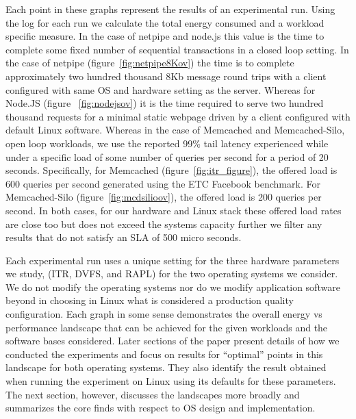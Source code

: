 Each point in these graphs represent the results of an experimental run.  Using
the log for each run we calculate the total energy consumed and a workload
specific measure.  In the case of netpipe and node.js this value is the time to
complete some fixed number of sequential transactions in a closed loop setting.
In the case of netpipe (figure~\ref{fig:netpipe8Kov}) the time is to complete
approximately two hundred thousand 8Kb message round trips with a client
configured with same OS and hardware setting as the server.  Whereas for
Node.JS (figure ~\ref{fig:nodejsov}) it is the time required to serve two
hundred thousand requests for a minimal static webpage driven by a client configured with default Linux software.  Whereas in the case of
Memcached and Memcached-Silo, open loop workloads, we use the reported 99\%
tail latency experienced while under a specific load of some number of queries
per second for a period of 20 seconds.  Specifically, for Memcached
(figure~\ref{fig:itr_figure}), the offered load is 600 queries per second
generated using the ETC Facebook benchmark.  For Memcached-Silo
(figure~\ref{fig:mcdsilioov}), the offered load is 200 queries per second.  In
both cases, for our hardware and Linux stack these offered load rates are close
too but does not exceed the systems capacity further we filter any results that
do not satisfy an SLA of 500 micro seconds.  

  Each experimental run uses a unique setting for the three hardware parameters we study,
(ITR, DVFS, and RAPL) for the two operating systems we consider.  We do not
modify the operating systems nor do we modify application software beyond in
choosing in Linux what is considered a production quality configuration.  Each
graph in some sense demonstrates the overall energy vs performance landscape
that can be achieved for the given workloads and the software bases considered.
Later sections of the paper present  details of how we conducted the
experiments
and  focus on results for “optimal” points in this landscape for both operating
systems.  They also identify the result obtained when running the experiment on
Linux using its defaults for these parameters.    The next section, however,
discusses the landscapes more broadly and summarizes the core finds
with respect to OS design and implementation.  

